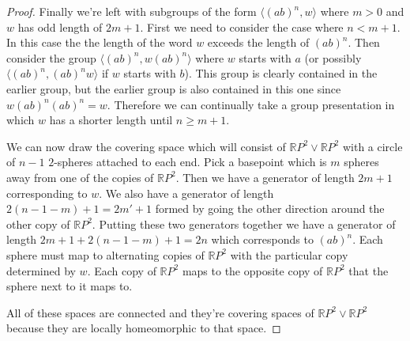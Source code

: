 \documentclass{article}
\begin{document}
\begin{proof}
Finally we're left with subgroups of the form $\langle (ab)^n, w \rangle$ where $m > 0$ and $w$ has odd length of $2m+1$. First we need to consider the case where $n < m+1$. In this case the the length of the word $w$ exceeds the length of $(ab)^n$. Then consider the group $\langle (ab)^n, w(ab)^n \rangle$ where $w$ starts with $a$ (or possibly $\langle (ab)^n, (ab)^n w \rangle$ if $w$ starts with $b$). This group is clearly contained in the earlier group, but the earlier group is also contained in this one since $w(ab)^n(ab)^n = w$. Therefore we can continually take a group presentation in which $w$ has a shorter length until $n \geq m+1$.

We can now draw the covering space which will consist of $\mathbb{R}P^2 \vee \mathbb{R}P^2$ with a circle of $n-1$ $2$-spheres attached to each end. Pick a basepoint which is $m$ spheres away from one of the copies of $\mathbb{R}P^2$. Then we have a generator of length $2m + 1$ corresponding to $w$.
\vspace{200pt}
We also have a generator of length $2(n-1-m) + 1 = 2m' + 1$ formed by going the other direction around the other copy of $\mathbb{R}P^2$. Putting these two generators together we have a generator of length $2m + 1 + 2(n-1-m) + 1 = 2n$ which corresponds to $(ab)^n$. Each sphere must map to alternating copies of $\mathbb{R}P^2$ with the particular copy determined by $w$. Each copy of $\mathbb{R}P^2$ maps to the opposite copy of $\mathbb{R}P^2$ that the sphere next to it maps to.

All of these spaces are connected and they're covering spaces of $\mathbb{R}P^2 \vee \mathbb{R}P^2$ because they are locally homeomorphic to that space.
\end{proof}
\end{document}
